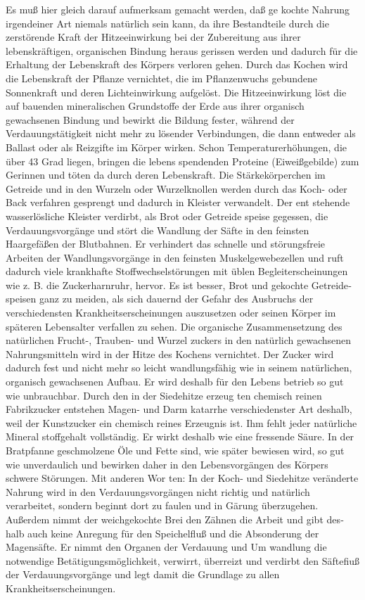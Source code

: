 Es muß hier gleich darauf aufmerksam gemacht werden, daß ge­
kochte Nahrung irgendeiner Art niemals natürlich sein kann, da ihre
Bestandteile durch die zerstörende Kraft der Hitzeeinwirkung bei der
Zubereitung aus ihrer lebenskräftigen, organischen Bindung heraus­
gerissen werden und dadurch für die Erhaltung der Lebenskraft des
Körpers verloren gehen. Durch das Kochen wird die Lebenskraft der
Pflanze vernichtet, die im Pflanzenwuchs gebundene Sonnenkraft und
deren Lichteinwirkung aufgelöst. Die Hitzeeinwirkung löst die auf­
bauenden mineralischen Grundstoffe der Erde aus ihrer organisch
gewachsenen Bindung und bewirkt die Bildung fester, während der
Verdauungstätigkeit nicht mehr zu lösender Verbindungen, die dann
entweder als Ballast oder als Reizgifte im Körper wirken. Schon
Temperaturerhöhungen, die über 43 Grad liegen, bringen die lebens­
spendenden Proteine (Eiweißgebilde) zum Gerinnen und töten da­
durch deren Lebenskraft. Die Stärkekörperchen im Getreide und in
den Wurzeln oder Wurzelknollen werden durch das Koch- oder Back­
verfahren gesprengt und dadurch in Kleister verwandelt. Der ent­
stehende wasserlösliche Kleister verdirbt, als Brot oder Getreide­
speise gegessen, die Verdauungsvorgänge und stört die Wandlung der
Säfte in den feinsten Haargefäßen der Blutbahnen. Er verhindert das
schnelle und störungsfreie Arbeiten der Wandlungsvorgänge in den
feinsten Muskelgewebezellen und ruft dadurch viele krankhafte
Stoffwechselstörungen mit üblen Begleiterscheinungen wie z. B. die
Zuckerharnruhr, hervor. Es ist besser, Brot und gekochte Getreide­
speisen ganz zu meiden, als sich dauernd der Gefahr des Ausbruchs
der verschiedensten Krankheitserscheinungen auszusetzen oder seinen
Körper im späteren Lebensalter verfallen zu sehen. Die organische
Zusammensetzung des natürlichen Frucht-, Trauben- und Wurzel­
zuckers in den natürlich gewachsenen Nahrungsmitteln wird in der
Hitze des Kochens vernichtet. Der Zucker wird dadurch fest und
nicht mehr so leicht wandlungsfähig wie in seinem natürlichen,
organisch gewachsenen Aufbau. Er wird deshalb für den Lebens­
betrieb so gut wie unbrauchbar. Durch den in der Siedehitze erzeug­
ten chemisch reinen Fabrikzucker entstehen Magen- und Darm­
katarrhe verschiedenster Art deshalb, weil der Kunstzucker ein
chemisch reines Erzeugnis ist. Ihm fehlt jeder natürliche Mineral­
stoffgehalt vollständig. Er wirkt deshalb wie eine fressende Säure.
In der Bratpfanne geschmolzene Öle und Fette sind, wie später
bewiesen wird, so gut wie unverdaulich und bewirken daher in den
Lebensvorgängen des Körpers schwere Störungen. Mit anderen Wor­
ten: In der Koch- und Siedehitze veränderte Nahrung wird in den
Verdauungsvorgängen nicht richtig und natürlich verarbeitet, sondern
beginnt dort zu faulen und in Gärung überzugehen. Außerdem
nimmt der weichgekochte Brei den Zähnen die Arbeit und gibt des­
halb auch keine Anregung für den Speichelfluß und die Absonderung
der Magensäfte. Er nimmt den Organen der Verdauung und Um­
wandlung die notwendige Betätigungsmöglichkeit, verwirrt, überreizt
und verdirbt den Säftefiuß der Verdauungsvorgänge und legt damit
die Grundlage zu allen Krankheitserscheinungen.